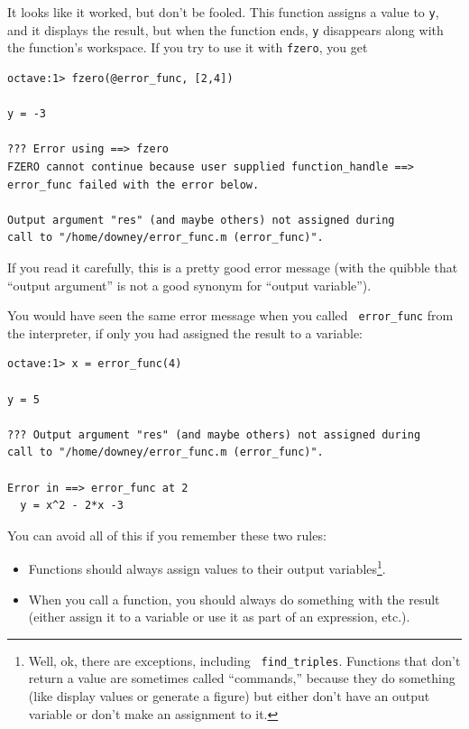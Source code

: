 \documentclass{book}
\begin{document}
It looks like it worked, but don't be fooled. This function assigns
a value to {\tt y}, and it displays the result, but when the function
ends, {\tt y} disappears along with the function's workspace.
If you try to use it with {\tt fzero}, you get

\begin{verbatim}
octave:1> fzero(@error_func, [2,4])

y = -3

??? Error using ==> fzero
FZERO cannot continue because user supplied function_handle ==> 
error_func failed with the error below.

Output argument "res" (and maybe others) not assigned during 
call to "/home/downey/error_func.m (error_func)".
\end{verbatim}

If you read it carefully, this is a pretty good error message
(with the quibble that ``output argument'' is not a good synonym
for ``output variable'').

You would have seen the same error message when you called {\tt
error\_func} from the interpreter, if only you had assigned the result
to a variable:

\begin{verbatim}
octave:1> x = error_func(4)

y = 5

??? Output argument "res" (and maybe others) not assigned during 
call to "/home/downey/error_func.m (error_func)".

Error in ==> error_func at 2
  y = x^2 - 2*x -3
\end{verbatim}

You can avoid all of this if you remember these two rules:

\begin{itemize}

\item Functions should always assign values to their output
variables\footnote{Well, ok, there are exceptions, including {\tt
find\_triples}. Functions that don't return a value are sometimes
called ``commands,'' because they do something (like display values or
generate a figure) but either don't have an output variable or don't
make an assignment to it.}.

\item When you call a function, you should always do something with
the result (either assign it to a variable or use it as part of an
expression, etc.).

\end{itemize}
\end{document}
